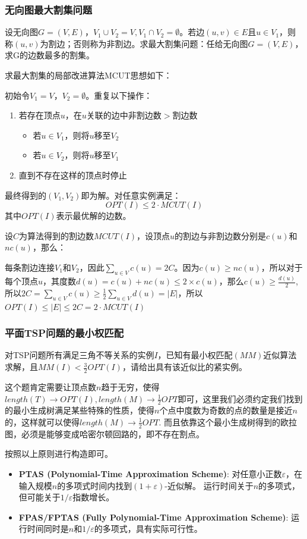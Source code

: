 \documentclass[./../main.tex]{subfiles} %
\begin{document}
\subsubsection{无向图最大割集问题}
设无向图$G=(V, E)$，$V_1 \cup V_2 = V, V_1\cap V_2=\emptyset$。若边$(u, v) \in E$且$u \in V_1$，则称$(u, v)$为割边；否则称为非割边。求最大割集问题：任给无向图$G=(V, E)$，求G的边数最多的割集。

求最大割集的局部改进算法MCUT思想如下：

初始令$V_1 = V$，$V_2 = \emptyset$。重复以下操作：
\begin{enumerate}
    \item 若存在顶点$u$，在$u$关联的边中非割边数$>$割边数
    \begin{itemize}
        \item 若$u \in V_1$，则将$u$移至$V_2$
        \item 若$u \in V_2$，则将$u$移至$V_1$
    \end{itemize}
    \item 直到不存在这样的顶点时停止
\end{enumerate}

最终得到的$(V_1, V_2)$即为解。对任意实例满足：
$$
OPT(I) \leq 2 \cdot MCUT(I)
$$
其中$OPT(I)$表示最优解的边数。

设$C$为算法得到的割边数$MCUT(I)$，设顶点$u$的割边与非割边数分别是$c(u)$和$nc(u)$，那么：

每条割边连接$V_1$和$V_2$，因此$\sum_{u\in V}c(u)=2C$。因为$c(u)\ge nc(u)$，所以对于每个顶点$u$，其度数$d(u)=c(u)+nc(u)\le2\times c(u)$，那么$c(u)\ge\frac{d(u)}{2}$, 所以$2C=\sum_{u\in V} c(u)\ge\frac{1}{2}\sum_{u\in V}d(u)=|E|$，所以$OPT(I)\le|E|\le2C=2\cdot MCUT(I)$


\subsubsection{平面TSP问题的最小权匹配}
对TSP问题所有满足三角不等关系的实例$I$，已知有最小权匹配$(MM)$近似算法求解，且$MM(I)<\frac{3}{2}OPT(I)$，请给出具有该近似比的紧实例。


这个题肯定需要让顶点数$n$趋于无穷，使得$length(T)\to OPT(I), length(M)\to \frac{1}{2}OPT$即可，这里我们必须约定我们找到的最小生成树满足某些特殊的性质，使得$n$个点中度数为奇数的点的数量是接近$n$的，这样就可以使得$length(M)\to \frac{1}{2}OPT$.
而且依靠这个最小生成树得到的欧拉图，必须是能够变成哈密尔顿回路的，即不存在割点。

按照以上原则进行构造即可。


\begin{itemize}
    \item \textbf{PTAS (Polynomial-Time Approximation Scheme)}:
    对任意小正数$\varepsilon$，在输入规模$n$的多项式时间内找到$(1+\varepsilon)$-近似解。
    运行时间关于$n$的多项式，但可能关于$1/\varepsilon$指数增长。
    
    \item \textbf{FPAS/FPTAS (Fully Polynomial-Time Approximation Scheme)}:
    运行时间同时是$n$和$1/\varepsilon$的多项式，具有实际可行性。
\end{itemize}
\end{document}
